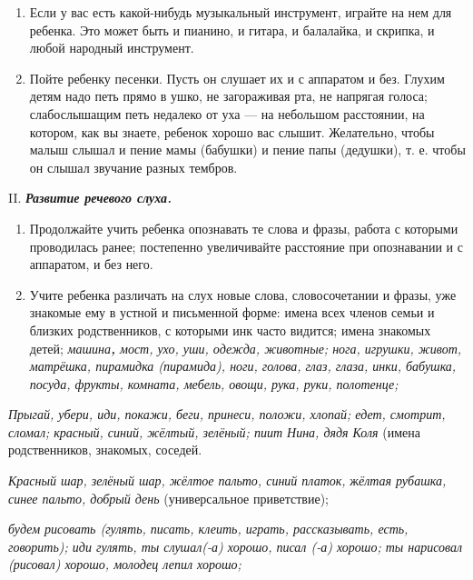 \documentclass[a5paper]{book}
\renewcommand{\emph}[1]{\textit{#1}}
\begin{document}
\begin{enumerate}
\item
  
  Если у вас есть какой-нибудь музыкальный инструмент, играйте на нем
  для ребенка. Это может быть и пианино, и гитара, и балалайка, и
  скрипка, и любой народный инструмент.
  
\item
  
  Пойте ребенку песенки. Пусть он слушает их и с аппаратом и без. Глухим
  детям надо петь прямо в ушко, не загораживая рта, не напрягая голоса;
  слабослышащим петь недалеко от уха --- на небольшом расстоянии, на
  котором, как вы знаете, ребенок хорошо вас слышит. Желательно, чтобы
  малыш слышал и пение мамы (бабушки) и пение папы (дедушки), т. е.
  чтобы он слышал звучание разных тембров.
  
\end{enumerate}


II. \emph{\textbf{Развитие речевого слуха.}}


\begin{enumerate}
\def\labelenumi{\arabic{enumi}.}
\item
  
  Продолжайте учить ребенка опознавать те слова и фразы, работа с
  которыми проводилась ранее; постепенно увеличивайте расстояние при
  опознавании и с аппаратом, и без него.
  
\item
  
  Учите ребенка различать на слух новые слова, словосочетании и фразы,
  уже знакомые ему в устной и письменной форме: имена всех членов семьи
  и близких родственников, с которыми инк часто видится; имена знакомых
  детей; \emph{машина\textbf{,} мост, ухо, уши, одежда, животные; нога,
  игрушки, живот, матрёшка, пирамидка (пирамида), ноги, голова, глаз,
  глаза, инки, бабушка, посуда, фрукты, комната, мебель, овощи, рука,
  руки, полотенце;}
  
\end{enumerate}


\emph{Прыгай, убери, иди, покажи, беги, принеси, положи, хлопай; едет,
смотрит, сломал; красный, синий, жёлтый, зелёный; пиит Нина, дядя Коля}
(имена родственников, знакомых, соседей.

\emph{Красный шар, зелёный шар, жёлтое пальто, синий платок,}
ж\emph{ёлтая рубашка, синее пальто, добрый день} (универсальное
приветствие);

\emph{будем рисовать (гулять, писать, клеить, играть, рассказывать,
есть, говорить); иди гулять, ты слушал(-а) хорошо, писал (-а) хорошо; ты
нарисовал (рисовал) хорошо, молодец лепил хорошо;}
\end{document}
